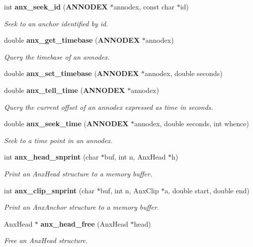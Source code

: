 \begin{CompactItemize}
int {\bf anx\_\-seek\_\-id} ({\bf ANNODEX} $\ast$annodex, const char $\ast$id)
\begin{CompactList}\small\item\em Seek to an anchor identified by id. \item\end{CompactList}\item 
double {\bf anx\_\-get\_\-timebase} ({\bf ANNODEX} $\ast$annodex)
\begin{CompactList}\small\item\em Query the timebase of an annodex. \item\end{CompactList}\item 
double {\bf anx\_\-set\_\-timebase} ({\bf ANNODEX} $\ast$annodex, double seconds)
\item 
double {\bf anx\_\-tell\_\-time} ({\bf ANNODEX} $\ast$annodex)
\begin{CompactList}\small\item\em Query the current offset of an annodex expressed as time in seconds. \item\end{CompactList}\item 
double {\bf anx\_\-seek\_\-time} ({\bf ANNODEX} $\ast$annodex, double seconds, int whence)
\begin{CompactList}\small\item\em Seek to a time point in an annodex. \item\end{CompactList}\item 
int {\bf anx\_\-head\_\-snprint} (char $\ast$buf, int n, Anx\-Head $\ast$h)
\begin{CompactList}\small\item\em Print an Anx\-Head structure to a memory buffer. \item\end{CompactList}\item 
int {\bf anx\_\-clip\_\-snprint} (char $\ast$buf, int n, Anx\-Clip $\ast$a, double start, double end)
\begin{CompactList}\small\item\em Print an Anx\-Anchor structure to a memory buffer. \item\end{CompactList}\item 
Anx\-Head $\ast$ {\bf anx\_\-head\_\-free} (Anx\-Head $\ast$head)
\begin{CompactList}\small\item\em Free an Anx\-Head structure. \item\end{CompactList}\item 

\end{CompactItemize}
